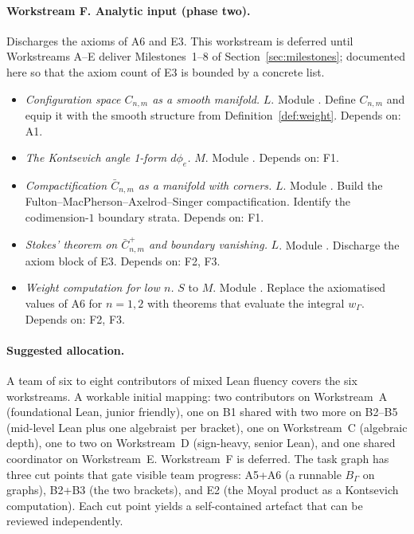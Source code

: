 \documentclass[11pt,a4paper]{article}
\theoremstyle{definition}
\newcommand{\defi}[1]{\emph{#1}}
\begin{document}
\paragraph{Workstream F. Analytic input (phase two).}
Discharges the axioms of A6 and E3. This workstream is deferred
until Workstreams A--E deliver Milestones~1--8 of
Section~\ref{sec:milestones}; documented here so that the axiom
count of E3 is bounded by a concrete list.
\begin{itemize}[leftmargin=2em]
  \item[\textbf{F1}]
    \defi{Configuration space $C_{n,m}$ as a smooth manifold.} $L$.
    Module . Define $C_{n,m}$ and
    equip it with the smooth structure from
    Definition~\ref{def:weight}. Depends on: A1.
  \item[\textbf{F2}]
    \defi{The Kontsevich angle 1-form $d\phi_{e}$.} $M$. Module
    . Depends on: F1.
  \item[\textbf{F3}]
    \defi{Compactification $\bar C_{n,m}$ as a manifold with
          corners.} $L$. Module .
    Build the Fulton--MacPherson--Axelrod--Singer compactification.
    Identify the codimension-$1$ boundary strata. Depends on: F1.
  \item[\textbf{F4}]
    \defi{Stokes' theorem on $\bar C_{n,m}^{+}$ and boundary
          vanishing.} $L$. Module .
    Discharge the axiom block of E3. Depends on: F2, F3.
  \item[\textbf{F5}]
    \defi{Weight computation for low $n$.} $S$ to $M$. Module
    . Replace the axiomatised
    values of A6 for $n = 1, 2$ with theorems that evaluate the
    integral $w_{\Gamma}$. Depends on: F2, F3.
\end{itemize}

\paragraph{Suggested allocation.}
A team of six to eight contributors of mixed Lean fluency covers the
six workstreams. A workable initial mapping:
two contributors on Workstream~A (foundational Lean, junior
friendly), one on B1 shared with two more on B2--B5 (mid-level Lean
plus one algebraist per bracket), one on Workstream~C (algebraic
depth), one to two on Workstream~D (sign-heavy, senior Lean), and
one shared coordinator on Workstream~E. Workstream~F is deferred.
The task graph has three cut points that gate visible team
progress: A5+A6 (a runnable $B_{\Gamma}$ on graphs), B2+B3
(the two brackets), and E2 (the Moyal product as a Kontsevich
computation). Each cut point yields a self-contained artefact that
can be reviewed independently.
\end{document}
